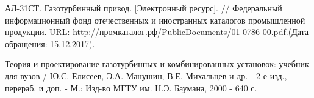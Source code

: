 \documentclass[a4paper,12pt]{article}
\begin{document}
\begin{thebibliography}{40}
        АЛ-31СТ. Газотурбинный привод. [Электронный ресурс]. //
        Федеральный информационный фонд отечественных и иностранных каталогов промышленной продукции.
        URL: \url{http://промкаталог.рф/PublicDocuments/01-0786-00.pdf}.(Дата обращения: 15.12.2017).

        Теория и проектирование газотурбинных и комбинированных установок: учебник для вузов /
        Ю.С. Елисеев, Э.А. Манушин, В.Е. Михальцев и др. - 2-е изд., перераб. и доп. - М.:
        Изд-во МГТУ им. Н.Э. Баумана, 2000 - 640 с.

    \end{thebibliography}
\end{document}
